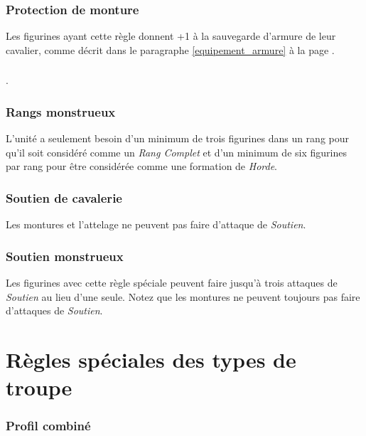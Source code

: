 \subsubsection*{Protection de monture}

Les figurines ayant cette règle donnent +1 à la sauvegarde d'armure de leur cavalier, comme décrit dans le paragraphe \ref{equipement_armure} à la page \pageref{equipement_armure}.

\subsubsection*{}

.

\subsubsection*{Rangs monstrueux}

L'unité a seulement besoin d'un minimum de trois figurines dans un rang pour qu'il soit considéré comme un \emph{Rang Complet} et d'un minimum de six figurines par rang pour être considérée comme une formation de \emph{Horde}.

\subsubsection*{Soutien de cavalerie}

Les montures et l'attelage ne peuvent pas faire d'attaque de \emph{Soutien}.

\subsubsection*{Soutien monstrueux}

Les figurines avec cette règle spéciale peuvent faire jusqu'à trois attaques de \emph{Soutien} au lieu d'une seule. Notez que les montures ne peuvent toujours pas faire d'attaques de \emph{Soutien}.


\section{Règles spéciales des types de troupe}

\subsubsection*{Profil combiné}

